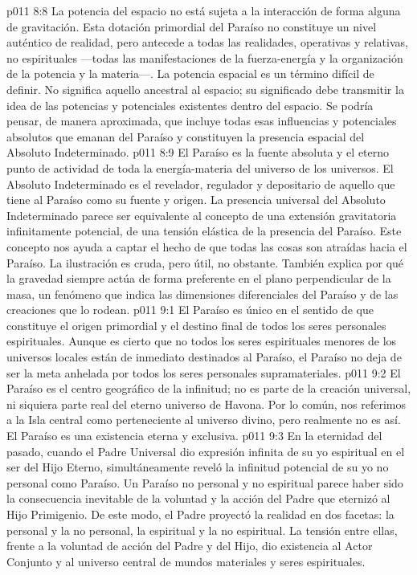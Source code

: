 \vs p011 8:8 \pc La potencia del espacio no está sujeta a la interacción de forma alguna de gravitación. Esta dotación primordial del Paraíso no constituye un nivel auténtico de realidad, pero antecede a todas las realidades, operativas y relativas, no espirituales ---todas las manifestaciones de la fuerza\hyp{}energía y la organización de la potencia y la materia---. La potencia espacial es un término difícil de definir. No significa aquello ancestral al espacio; su significado debe transmitir la idea de las potencias y potenciales existentes dentro del espacio. Se podría pensar, de manera aproximada, que incluye todas esas influencias y potenciales absolutos que emanan del Paraíso y constituyen la presencia espacial del Absoluto Indeterminado.
\vs p011 8:9 El Paraíso es la fuente absoluta y el eterno punto de actividad de toda la energía\hyp{}materia del universo de los universos. El Absoluto Indeterminado es el revelador, regulador y depositario de aquello que tiene al Paraíso como su fuente y origen. La presencia universal del Absoluto Indeterminado parece ser equivalente al concepto de una extensión gravitatoria infinitamente potencial, de una tensión elástica de la presencia del Paraíso. Este concepto nos ayuda a captar el hecho de que todas las cosas son atraídas hacia el Paraíso. La ilustración es cruda, pero útil, no obstante. También explica por qué la gravedad siempre actúa de forma preferente en el plano perpendicular de la masa, un fenómeno que indica las dimensiones diferenciales del Paraíso y de las creaciones que lo rodean.
\vs p011 9:1 El Paraíso es único en el sentido de que constituye el origen primordial y el destino final de todos los seres personales espirituales. Aunque es cierto que no todos los seres espirituales menores de los universos locales están de inmediato destinados al Paraíso, el Paraíso no deja de ser la meta anhelada por todos los seres personales supramateriales.
\vs p011 9:2 \pc El Paraíso es el centro geográfico de la infinitud; no es parte de la creación universal, ni siquiera parte real del eterno universo de Havona. Por lo común, nos referimos a la Isla central como perteneciente al universo divino, pero realmente no es así. El Paraíso es una existencia eterna y exclusiva.
\vs p011 9:3 \pc En la eternidad del pasado, cuando el Padre Universal dio expresión infinita de su yo espiritual en el ser del Hijo Eterno, simultáneamente reveló la infinitud potencial de su yo no personal como Paraíso. Un Paraíso no personal y no espiritual parece haber sido la consecuencia inevitable de la voluntad y la acción del Padre que eternizó al Hijo Primigenio. De este modo, el Padre proyectó la realidad en dos facetas: la personal y la no personal, la espiritual y la no espiritual. La tensión entre ellas, frente a la voluntad de acción del Padre y del Hijo, dio existencia al Actor Conjunto y al universo central de mundos materiales y seres espirituales.

